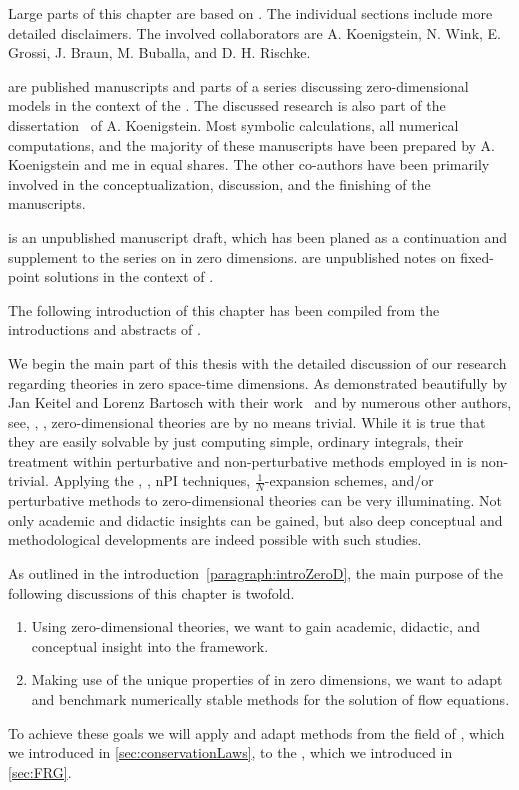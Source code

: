 \begin{disclaimer}
	Large parts of this chapter are based on .
	The individual sections include more detailed disclaimers.
	The involved collaborators are A. Koenigstein, N. Wink, E. Grossi, J. Braun, M. Buballa, and D. H. Rischke. 

	 are published manuscripts and parts of a series discussing zero-dimensional \ON{} models in the context of the \frg{}. The discussed research is also part of the dissertation~\cite{Koenigstein:2022phd} of A. Koenigstein. Most symbolic calculations, all numerical computations, and the majority of these manuscripts have been prepared by A. Koenigstein and me in equal shares. The other co-authors have been primarily involved in the conceptualization, discussion, and the finishing of the manuscripts.
		
	 is an unpublished manuscript draft, which has been planed as a continuation and supplement to the series on \frg{} in zero dimensions.
	 are unpublished notes on fixed-point solutions in the context of .
	
	The following introduction of this chapter has been compiled from the introductions and abstracts of .
\end{disclaimer}

We begin the main part of this thesis with the detailed discussion of our research regarding theories in zero space-time dimensions.
As demonstrated beautifully by Jan Keitel and Lorenz Bartosch with their work~\cite{Keitel:2011pn} and by numerous other authors, see, \eg{}, \ccite{\zerodRefs}, zero-dimensional theories are by no means trivial.
While it is true that they are easily solvable by just computing simple, ordinary integrals, their treatment within perturbative and non-perturbative methods employed in \qft{} is non-trivial.
Applying the \frg{}, \dses{}, nPI techniques, $\tfrac{1}{N}$-expansion schemes, and/or perturbative methods to zero-dimensional theories can be very illuminating.
Not only academic and didactic insights can be gained, but also deep conceptual and methodological developments are indeed possible with such studies.\bigskip 

As outlined in the introduction~\ref{paragraph:introZeroD}, the main purpose of the following discussions of this chapter is twofold.
\begin{enumerate}
	\item Using zero-dimensional theories, we want to gain academic, didactic, and conceptual insight into the \frg{} framework.
	\item Making use of the unique properties of \qfts{} in zero dimensions, we want to adapt and benchmark numerically stable methods for the solution of \frg{} flow equations.
\end{enumerate}
To achieve these goals we will apply and adapt methods from the field of \cfd{}, which we introduced in \cref{sec:conservationLaws}, to the \frg{}, which we introduced in \cref{sec:FRG}.

